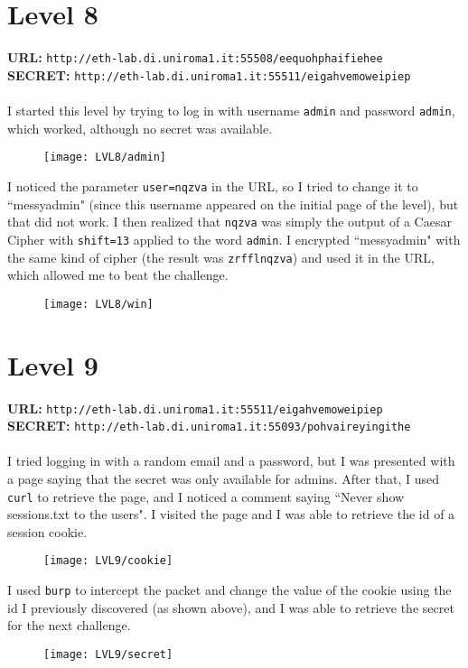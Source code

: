 \documentclass[12pt,a4paper]{article}
\begin{document}
	\section*{Level 8}
	\textbf{URL: }\texttt{http://eth-lab.di.uniroma1.it:55508/eequohphaifiehee}\\
	\textbf{SECRET: }\texttt{http://eth-lab.di.uniroma1.it:55511/eigahvemoweipiep}\\\\
	I started this level by trying to log in with username \texttt{admin} and password \texttt{admin}, which worked, although no secret was available.
	\begin{figure}[H]
		\centering
		\texttt{[image: LVL8/admin]}
		\label{fig:admin8}
	\end{figure}
	
	I noticed the parameter \texttt{user=nqzva} in the URL, so I tried to change it to ``messyadmin" (since this username appeared on the initial page of the level), but that did not work. I then realized that \texttt{nqzva} was simply the output of a Caesar Cipher with \texttt{shift=13} applied to the word \texttt{admin}. I encrypted ``messyadmin" with the same kind of cipher (the result was \texttt{zrfflnqzva}) and used it in the URL, which allowed me to beat the challenge.
	\begin{figure}[H]
		\centering
		\texttt{[image: LVL8/win]}
		\label{fig:win8}
	\end{figure}

	\section*{Level 9}
	\textbf{URL: }\texttt{http://eth-lab.di.uniroma1.it:55511/eigahvemoweipiep}\\
	\textbf{SECRET: }\texttt{http://eth-lab.di.uniroma1.it:55093/pohvaireyingithe}\\\\
	I tried logging in with a random email and a password, but I was presented with a page saying that the secret was only available for admins. After that, I used \texttt{curl} to retrieve the page, and I noticed a comment saying ``Never show sessions.txt to the users". I visited the page and I was able to retrieve the id of a session cookie.
	\begin{figure}[H]
		\centering
		\texttt{[image: LVL9/cookie]}
		\label{fig:cookie9}
	\end{figure}
	I used \texttt{burp} to intercept the packet and change the value of the cookie using the id I previously discovered (as shown above), and I was able to retrieve the secret for the next challenge.
	\begin{figure}[H]
		\centering
		\texttt{[image: LVL9/secret]}
		\label{fig:secret9}
	\end{figure}
	
\end{document}
